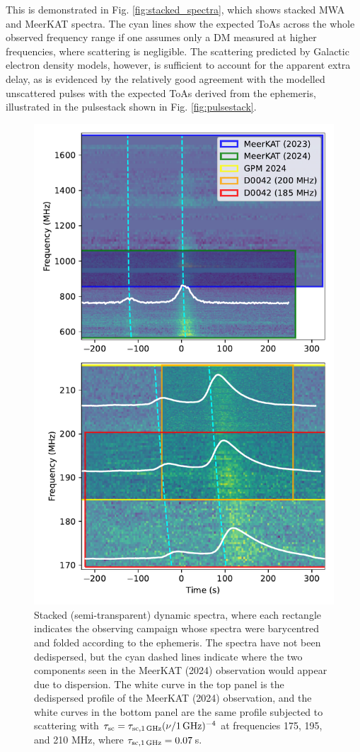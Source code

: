 \documentclass[preprint2,linenumbers]{aastex631}
\begin{document}
This is demonstrated in Fig. \ref{fig:stacked_spectra}, which shows stacked MWA and MeerKAT spectra.
The cyan lines show the expected ToAs across the whole observed frequency range if one assumes only a DM measured at higher frequencies, where scattering is negligible.
The scattering predicted by Galactic electron density models, however, is sufficient to account for the apparent extra delay, as is evidenced by the relatively good agreement with the modelled unscattered pulses with the expected ToAs derived from the ephemeris, illustrated in the pulsestack shown in Fig. \ref{fig:pulsestack}.

\begin{figure}[th]
      \centering
          \includegraphics[width=0.95\linewidth]{stacked_spectra.pdf}
              \caption{Stacked (semi-transparent) dynamic spectra, where each rectangle indicates the observing campaign whose spectra were barycentred and folded according to the ephemeris. The spectra have not been dedispersed, but the cyan dashed lines indicate where the two components seen in the MeerKAT (2024) observation would appear due to dispersion. The white curve in the top panel is the dedispersed profile of the MeerKAT (2024) observation, and the white curves in the bottom panel are the same profile subjected to scattering with $\tau_{\rm sc} = \tau_{\rm sc,1\,GHz} (\nu/{\rm 1\,GHz})^{-4}$ at frequencies 175, 195, and 210 MHz, where $\tau_{\rm sc,1\,GHz} = 0.07\,$s.}

\end{figure}
\end{document}
